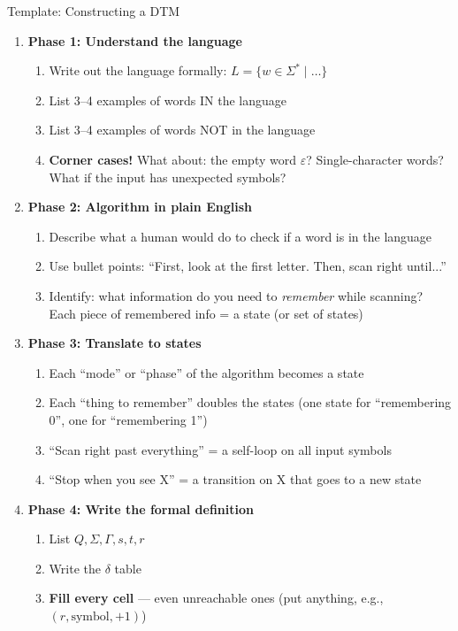 \documentclass[11pt,a4paper]{article}
\begin{document}
\begin{templatebox}{Template: Constructing a DTM}
\begin{enumerate}
    \item \textbf{Phase 1: Understand the language}
    \begin{enumerate}[label=(\alph*)]
        \item Write out the language formally: $L = \{w \in \Sigma^* \mid \ldots\}$
        \item List 3--4 examples of words IN the language
        \item List 3--4 examples of words NOT in the language
        \item \textbf{Corner cases!} What about: the empty word $\varepsilon$? Single-character words? What if the input has unexpected symbols?
    \end{enumerate}

    \item \textbf{Phase 2: Algorithm in plain English}
    \begin{enumerate}[label=(\alph*)]
        \item Describe what a human would do to check if a word is in the language
        \item Use bullet points: ``First, look at the first letter. Then, scan right until...''
        \item Identify: what information do you need to \emph{remember} while scanning? Each piece of remembered info = a state (or set of states)
    \end{enumerate}

    \item \textbf{Phase 3: Translate to states}
    \begin{enumerate}[label=(\alph*)]
        \item Each ``mode'' or ``phase'' of the algorithm becomes a state
        \item Each ``thing to remember'' doubles the states (one state for ``remembering 0'', one for ``remembering 1'')
        \item ``Scan right past everything'' = a self-loop on all input symbols
        \item ``Stop when you see X'' = a transition on X that goes to a new state
    \end{enumerate}

    \item \textbf{Phase 4: Write the formal definition}
    \begin{enumerate}[label=(\alph*)]
        \item List $Q, \Sigma, \Gamma, s, t, r$
        \item Write the $\delta$ table
        \item \textbf{Fill every cell} --- even unreachable ones (put anything, e.g., $(r, \text{symbol}, +1)$)
    \end{enumerate}


\end{enumerate}
\end{templatebox}
\end{document}
